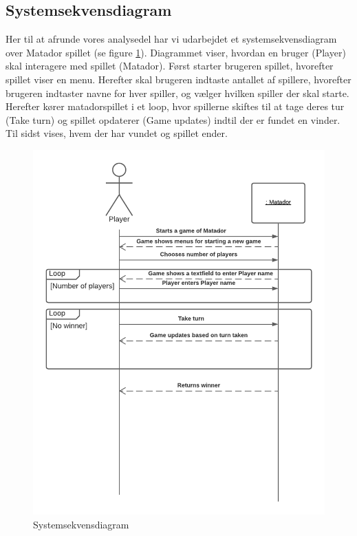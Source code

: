 \begin{flushleft}
\subsection{Systemsekvensdiagram}
Her til at afrunde vores analysedel har vi udarbejdet et systemsekvensdiagram over Matador spillet (se figure \ref{Systemsekvensdiagram}). Diagrammet viser, hvordan en bruger (Player) skal interagere med spillet (Matador). Først starter brugeren spillet, hvorefter spillet viser en menu. Herefter skal brugeren indtaste antallet af spillere, hvorefter brugeren indtaster navne for hver spiller, og vælger hvilken spiller der skal starte. Herefter kører matadorspillet i et loop, hvor spillerne skiftes til at tage deres tur (Take turn) og spillet opdaterer (Game updates) indtil der er fundet en vinder. Til sidst vises, hvem der har vundet og spillet ender.
\begin{figure}[htp]
    \centering
    \includegraphics[width=13cm]{Report/figures/System Sekvens Diagram.png}
    \caption{Systemsekvensdiagram}
    \label{Systemsekvensdiagram}
\end{figure}

\end{flushleft}